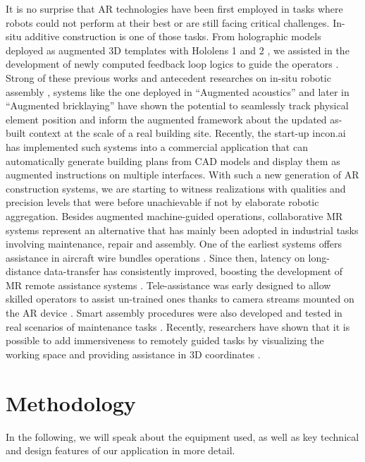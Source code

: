 \documentclass[10pt,twocolumn,letterpaper,english]{article}
\begin{document}
It is no surprise that AR technologies have been first employed in tasks where robots could not perform at their best or are still facing critical challenges. In-situ additive construction is one of those tasks. From holographic models deployed as augmented 3D templates with Hololens 1 and 2 \cite{holographicconstruction}, we assisted in the development of newly computed feedback loop logics to guide the operators \cite{objectbasedvisualinertia}. Strong of these previous works and antecedent researches on in-situ robotic assembly \cite{autoreposition, kinematic}, systems like the one deployed in ``Augmented acoustics'' \cite{augmentedacoustics} and later in ``Augmented bricklaying'' \cite{augmentedbricklaying} have shown the potential to seamlessly track physical element position and inform the augmented framework about the updated as-built context at the scale of a real building site. Recently, the start-up incon.ai \cite{incon} has implemented such systems into a commercial application that can automatically generate building plans from CAD models and display them as augmented instructions on multiple interfaces. With such a new generation of AR construction systems, we are starting to witness realizations with qualities and precision levels that were before unachievable if not by elaborate robotic aggregation. Besides augmented machine-guided operations, collaborative MR systems represent an alternative that has mainly been adopted in industrial tasks involving maintenance, repair and assembly. One of the earliest systems offers assistance in aircraft wire bundles operations \cite{caudell1992augmented}. Since then, latency on long-distance data-transfer has consistently improved, boosting the development of MR remote assistance systems \cite{zhong2002collaborative, chen2013semarbeta}. Tele-assistance was early designed to allow skilled operators to assist un-trained ones thanks to camera streams mounted on the AR device \cite{bottecchia2010tac}. Smart assembly procedures were also developed and tested in real scenarios of maintenance tasks \cite{mourtzis2016cloud}. Recently, researchers have shown that it is possible to add immersiveness to remotely guided tasks by visualizing the working space and providing assistance in 3D coordinates \cite{wang2014augmented, yin2020vr}.


\section{Methodology}

In the following, we will speak about the equipment used, as well as key technical and design features of our application in more detail.
\end{document}
